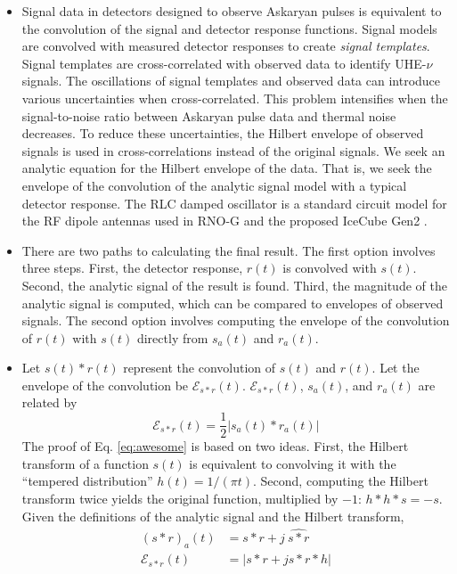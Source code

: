 \documentclass[amsmath,amssymb,aps,prd,10pt,twocolumn,showkeys]{revtex4}
\begin{document}
\begin{itemize}
\item Signal data in detectors designed to observe Askaryan pulses is equivalent to the convolution of the signal and detector response functions.  Signal models are convolved with measured detector responses to create \textit{signal templates}.  Signal templates are cross-correlated with observed data to identify UHE-$\nu$ signals.  The oscillations of signal templates and observed data can introduce various uncertainties when cross-correlated.  This problem intensifies when the signal-to-noise ratio between Askaryan pulse data and thermal noise decreases.  To reduce these uncertainties, the Hilbert envelope of observed signals is used in cross-correlations instead of the original signals.  We seek an analytic equation for the Hilbert envelope of the data.  That is, we seek the envelope of the convolution of the analytic signal model with a typical detector response.  The RLC damped oscillator is a standard circuit model for the RF dipole antennas used in RNO-G and the proposed IceCube Gen2 \cite{10.1103/PhysRevD.85.062004,10.1088/1748-0221/16/03/p03025,10.48550/arxiv.2008.04323}.
\item There are two paths to calculating the final result.  The first option involves three steps.  First, the detector response, $r(t)$ is convolved with $s(t)$.  Second, the analytic signal of the result is found.  Third, the magnitude of the analytic signal is computed, which can be compared to envelopes of observed signals.  The second option involves computing the envelope of the convolution of $r(t)$ with $s(t)$ directly from $s_a(t)$ and $r_a(t)$.
\item Let $s(t) * r(t)$ represent the convolution of $s(t)$ and $r(t)$.  Let the envelope of the convolution be $\mathcal{E}_{s * r}(t)$.  $\mathcal{E}_{s * r}(t)$, $s_a(t)$, and $r_a(t)$ are related by
\begin{equation}
\mathcal{E}_{s * r}(t) = \frac{1}{2}| s_a (t) * r_a(t)| \label{eq:awesome}
\end{equation}
The proof of Eq. \ref{eq:awesome} is based on two ideas.  First, the Hilbert transform of a function $s(t)$ is equivalent to convolving it with the ``tempered distribution'' $h(t) = 1/(\pi t)$.  Second, computing the Hilbert transform twice yields the original function, multiplied by $-1$: $h * h * s = -s$.  Given the definitions of the analytic signal and the Hilbert transform,
\begin{align}
(s * r)_a (t) &= s * r + j ~ \widehat{s*r} \\
\mathcal{E}_{s * r}(t) &= | s * r + j s * r * h|

\end{align}
\end{itemize}
\end{document}
